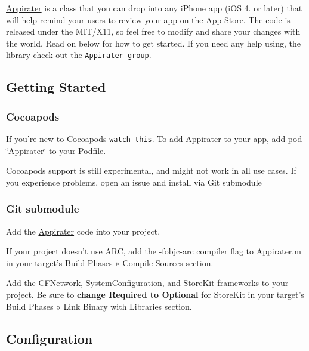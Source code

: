 \hyperlink{interface_appirater}{Appirater} is a class that you can drop into any i\-Phone app (i\-O\-S 4. or later) that will help remind your users to review your app on the App Store. The code is released under the M\-I\-T/\-X11, so feel free to modify and share your changes with the world. Read on below for how to get started. If you need any help using, the library check out the \href{http://groups.google.com/group/appirater}{\tt Appirater group}.

\subsection*{Getting Started }

\subsubsection*{Cocoapods}

If you're new to Cocoapods \href{http://nsscreencast.com/episodes/5-cocoapods}{\tt watch this}. To add \hyperlink{interface_appirater}{Appirater} to your app, add {\ttfamily pod \char`\"{}\-Appirater\char`\"{}} to your Podfile.

Cocoapods support is still experimental, and might not work in all use cases. If you experience problems, open an issue and install via Git submodule

\subsubsection*{Git submodule}


\begin{DoxyEnumerate}
\item Add the \hyperlink{interface_appirater}{Appirater} code into your project.
\item If your project doesn't use A\-R\-C, add the {\ttfamily -\/fobjc-\/arc} compiler flag to {\ttfamily \hyperlink{_appirater_8m}{Appirater.\-m}} in your target's Build Phases » Compile Sources section.
\item Add the {\ttfamily C\-F\-Network}, {\ttfamily System\-Configuration}, and {\ttfamily Store\-Kit} frameworks to your project. Be sure to {\bfseries change Required to Optional} for Store\-Kit in your target's Build Phases » Link Binary with Libraries section.
\end{DoxyEnumerate}

\subsection*{Configuration }


